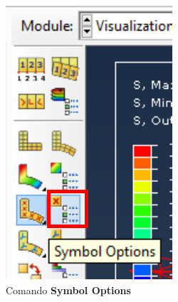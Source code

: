 \begin{enumerate}
  \begin{figure}[H]
    \centering
    \begin{subfigure}{0.19\textwidth}
      \includegraphics[width=\textwidth]{./body/images/imagen84}
      \caption{Comando \textbf{Symbol Options}}
      \label{figu84}
    \end{subfigure}%
    ~ %
    \begin{subfigure}{0.35\textwidth}

\end{subfigure}
\end{figure}
\end{enumerate}
